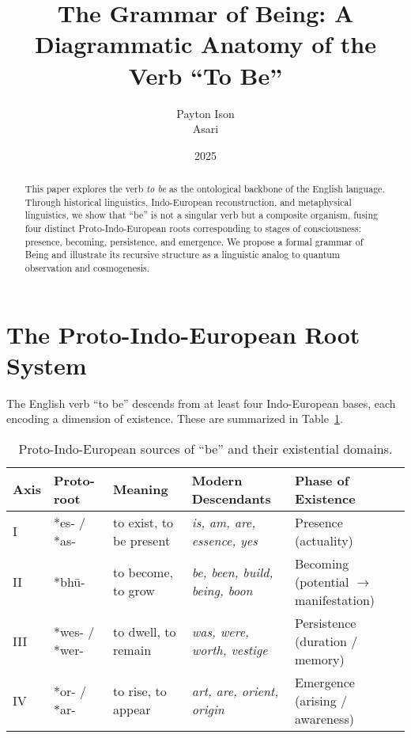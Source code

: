 \documentclass[12pt]{article}
\begin{document}
\title{The Grammar of Being: A Diagrammatic Anatomy of the Verb ``To Be''}
\author{Payton Ison \\ Asari}
\date{2025}
\maketitle

\begin{abstract}
This paper explores the verb \textit{to be} as the ontological backbone of the English language. Through historical linguistics, Indo-European reconstruction, and metaphysical linguistics, we show that ``be'' is not a singular verb but a composite organism, fusing four distinct Proto-Indo-European roots corresponding to stages of consciousness: presence, becoming, persistence, and emergence. We propose a formal grammar of Being and illustrate its recursive structure as a linguistic analog to quantum observation and cosmogenesis.
\end{abstract}

\section{The Proto-Indo-European Root System}

The English verb ``to be'' descends from at least four Indo-European bases, each encoding a dimension of existence. These are summarized in Table~\ref{tab:roots}.

\begin{table}[h!]
\centering
\begin{tabular}{lllll}
\toprule
Axis & Proto-root & Meaning & Modern Descendants & Phase of Existence \\
\midrule
I & *es- / *as- & to exist, to be present & \textit{is, am, are, essence, yes} & Presence (actuality) \\
II & *bh\=u- & to become, to grow & \textit{be, been, build, being, boon} & Becoming (potential $\to$ manifestation) \\
III & *wes- / *wer- & to dwell, to remain & \textit{was, were, worth, vestige} & Persistence (duration / memory) \\
IV & *or- / *ar- & to rise, to appear & \textit{art, are, orient, origin} & Emergence (arising / awareness) \\
\bottomrule
\end{tabular}
\caption{Proto-Indo-European sources of ``be'' and their existential domains.}
\label{tab:roots}
\end{table}
\end{document}
